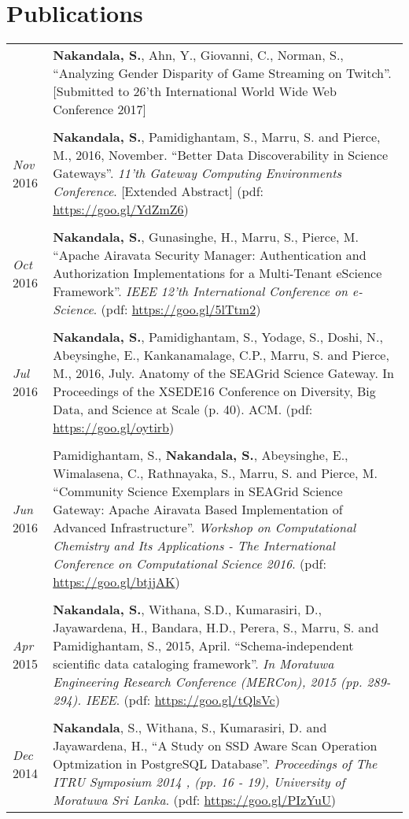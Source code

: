 \documentclass[a4paper,10pt]{article}
\begin{document}
\section{Publications}

\begin{tabular}{p{3cm}|p{13.5cm}}

& \textbf{Nakandala, S.}, Ahn, Y., Giovanni, C., Norman, S., ``Analyzing Gender Disparity of Game Streaming on Twitch''. [Submitted to 26'th International World Wide Web Conference 2017]\\\\
\emph{Nov} 2016 & \textbf{Nakandala, S.}, Pamidighantam, S., Marru, S. and Pierce, M., 2016, November. ``Better Data Discoverability in Science Gateways''. \textit{11'th Gateway Computing Environments Conference}. [Extended Abstract] (pdf: \url{https://goo.gl/YdZmZ6})
\\\\
\emph{Oct} 2016 & \textbf{Nakandala, S.}, Gunasinghe, H., Marru, S., Pierce, M. ``Apache Airavata Security Manager: Authentication and Authorization Implementations for a Multi-Tenant eScience Framework''. \textit{IEEE 12'th International Conference on e-Science}. (pdf: \url{https://goo.gl/5lTtm2})
\\\\
\emph{Jul} 2016 & \textbf{Nakandala, S.}, Pamidighantam, S., Yodage, S., Doshi, N., Abeysinghe, E., Kankanamalage, C.P., Marru, S. and Pierce, M., 2016, July. Anatomy of the SEAGrid Science Gateway. In Proceedings of the XSEDE16 Conference on Diversity, Big Data, and Science at Scale (p. 40). ACM. (pdf: \url{https://goo.gl/oytirb})
\\\\
\emph{Jun} 2016 & Pamidighantam, S., \textbf{Nakandala, S.}, Abeysinghe, E., Wimalasena, C., Rathnayaka, S., Marru, S. and Pierce, M. ``Community Science Exemplars in SEAGrid Science Gateway: Apache Airavata Based Implementation of Advanced Infrastructure''. \textit{Workshop on Computational Chemistry and Its Applications - The International Conference on Computational Science 2016}. (pdf: \url{https://goo.gl/btjjAK})
\\\\
\emph{Apr} 2015 & \textbf{Nakandala, S.}, Withana, S.D., Kumarasiri, D., Jayawardena, H., Bandara, H.D., Perera, S., Marru, S. and Pamidighantam, S., 2015, April. ``Schema-independent scientific data cataloging framework''. \textit{In Moratuwa Engineering Research Conference (MERCon), 2015 (pp. 289-294). IEEE}. (pdf: \url{https://goo.gl/tQlsVc})
\\\\
\emph{Dec} 2014 & \textbf{Nakandala}, S., Withana, S., Kumarasiri, D. and Jayawardena, H., ``A Study on SSD Aware Scan Operation Optmization in PostgreSQL Database''. \textit{Proceedings of The ITRU Symposium 2014 , (pp. 16 - 19), University of Moratuwa Sri Lanka}. (pdf: \url{https://goo.gl/PIzYuU})
\end{tabular}
\end{document}
